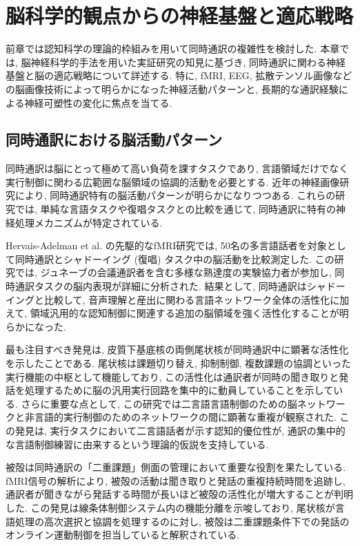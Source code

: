 \section{脳科学的観点からの神経基盤と適応戦略}

前章では認知科学の理論的枠組みを用いて同時通訳の複雑性を検討した.
本章では, 脳神経科学的手法を用いた実証研究の知見に基づき, 同時通訳に関わる神経基盤と脳の適応戦略について詳述する.
特に, fMRI, EEG, 拡散テンソル画像などの脳画像技術によって明らかになった神経活動パターンと, 長期的な通訳経験による神経可塑性の変化に焦点を当てる.

\subsection{同時通訳における脳活動パターン}

同時通訳は脳にとって極めて高い負荷を課すタスクであり, 言語領域だけでなく実行制御に関わる広範囲な脳領域の協調的活動を必要とする.
近年の神経画像研究により, 同時通訳特有の脳活動パターンが明らかになりつつある.
これらの研究では, 単純な言語タスクや復唱タスクとの比較を通じて, 同時通訳に特有の神経処理メカニズムが特定されている.

Hervais-Adelman et al. \cite{hervais2015fmri} の先駆的なfMRI研究では, 50名の多言語話者を対象として同時通訳とシャドーイング (復唱) タスク中の脳活動を比較測定した.
この研究では, ジュネーブの会議通訳者を含む多様な熟達度の実験協力者が参加し, 同時通訳タスクの脳内表現が詳細に分析された.
結果として, 同時通訳はシャドーイングと比較して, 音声理解と産出に関わる言語ネットワーク全体の活性化に加えて, 領域汎用的な認知制御に関連する追加の脳領域を強く活性化することが明らかになった.

最も注目すべき発見は, 皮質下基底核の両側尾状核が同時通訳中に顕著な活性化を示したことである.
尾状核は課題切り替え, 抑制制御, 複数課題の協調といった実行機能の中枢として機能しており, この活性化は通訳者が同時の聞き取りと発話を処理するために脳の汎用実行回路を集中的に動員していることを示している.
さらに重要な点として, この研究では二言語言語制御のための脳ネットワークと非言語的実行制御のためのネットワークの間に顕著な重複が観察された.
この発見は, 実行タスクにおいて二言語話者が示す認知的優位性が, 通訳の集中的な言語制御練習に由来するという理論的仮説を支持している.

被殻は同時通訳の「二重課題」側面の管理において重要な役割を果たしている.
fMRI信号の解析により, 被殻の活動は聞き取りと発話の重複持続時間を追跡し, 通訳者が聞きながら発話する時間が長いほど被殻の活性化が増大することが判明した.
この発見は線条体制御システム内の機能分離を示唆しており, 尾状核が言語処理の高次選択と協調を処理するのに対し, 被殻は二重課題条件下での発話のオンライン運動制御を担当していると解釈されている.

